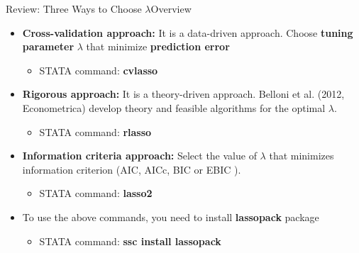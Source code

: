 \documentclass[dvipsnames,hyperref={pdfpagelabels=false}]{beamer}
\begin{document}
\begin{frame}{Review: Three Ways to Choose $\lambda$}{Overview}
	\begin{itemize}
		\item[1] \textbf{Cross-validation approach:} It is a data-driven approach. Choose \textbf{tuning parameter} $\lambda$ that minimize \textbf{prediction
			error}
		\vspace{0.2cm}
			\begin{itemize}
		\item STATA command: \textbf{cvlasso}
			\end{itemize}
				\vspace{0.2cm}
		\item[2] \textbf{Rigorous approach:} It is a theory-driven approach. Belloni et al. (2012, Econometrica) develop theory and feasible algorithms for the optimal $\lambda$.
			\vspace{0.2cm}
		\begin{itemize}
			\item STATA command: \textbf{rlasso}
		\end{itemize}

		\vspace{0.2cm}
		\item[3] \textbf{Information criteria approach:} Select the value of $\lambda$ that minimizes information criterion (AIC, AICc, BIC or EBIC
).
			\vspace{0.2cm}
		\begin{itemize}
			\item STATA command: \textbf{lasso2}
		\end{itemize}
					\vspace{0.2cm}
		\item To use the above commands, you need to install \textbf{lassopack} package
			\vspace{0.2cm}
		\begin{itemize}
			\item STATA command: \textbf{ssc install lassopack}
		\end{itemize}
		
		
	\end{itemize}
\end{frame}
\end{document}

